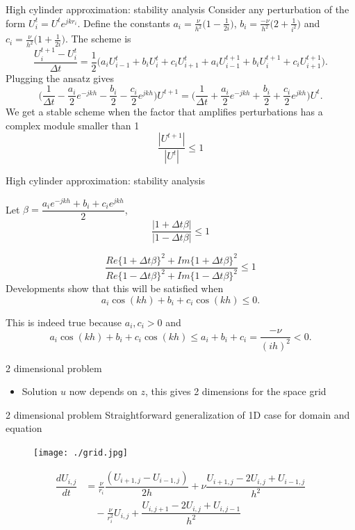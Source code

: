 \documentclass{beamer}
\begin{document}
\begin{frame}{High cylinder approximation: stability analysis}
Consider any perturbation of the form $U_{i}^{t}= U^{t}e^{jkr_i}.$
Define the constants $a_i=\frac{\nu}{h^2}\Big(1-\frac{1}{2i}\Big)$, $b_i=\frac{-\nu}{h^2}\Big(2+\frac{1}{i^2}\Big)$ and $c_i=\frac{\nu}{h^2}\Big(1+\frac{1}{2i}\Big)$. The scheme is 
$$\frac{U_{i}^{t+1}-U_{i}^{t}}{\Delta t}=\frac{1}{2}\Big( a_{i}U_{i-1}^{t}
+b_{i}U_{i}^{t}+c_{i}U_{i+1}^{t}
+ a_{i}U_{i-1}^{t+1}
+b_{i}U_{i}^{t+1}+c_{i}U_{i+1}^{t+1}\Big).$$
Plugging the ansatz gives
$$\Big(\frac{1}{\Delta t} -\frac{a_i}{2}e^{-jkh} -\frac{b_i}{2} -\frac{c_i}{2}e^{jkh}\Big)U^{t+1}=\Big(\frac{1}{\Delta t} +\frac{a_i}{2}e^{-jkh} +\frac{b_i}{2} +\frac{c_i}{2}e^{jkh}\Big)U^{t} .$$
 We get a stable scheme when the factor that amplifies perturbations has a complex module smaller than 1
 $$\dfrac{|U^{t+1}|}{|U^t|}\leq 1$$
\end{frame}
\begin{frame}{High cylinder approximation: stability analysis}

Let $\beta = \dfrac{a_ie^{-jkh} +b_i +c_ie^{jkh}}{2}$,
$$\dfrac{|1+\Delta t \beta|}{|1-\Delta t \beta|}\leq 1$$

$$\dfrac{Re\{1+\Delta t \beta\}^2 + Im\{1+\Delta t \beta\}^2 }{Re\{1-\Delta t \beta\}^2 + Im\{1-\Delta t \beta\}^2}\leq 1$$
Developments show that this will be satisfied when
$$a_i\cos(kh)+b_i + c_i \cos(kh)\leq 0.$$

This is indeed true because $a_i, c_i >0$ and
$$a_i\cos(kh)+b_i + c_i \cos(kh)\leq a_i + b_i + c_i = \frac{-\nu}{(ih)^2}< 0.$$

\end{frame}



\begin{frame}{2 dimensional problem}
\begin{itemize}
\item Solution $u$ now depends on $z$, this gives 2 dimensions for the space grid
\end{itemize}
\end{frame}

\begin{frame}{2 dimensional problem}
Straightforward generalization of 1D case for domain and equation

\begin{figure}[!h]
\centering
\texttt{[image: ./grid.jpg]}
\end{figure}
\begin{align*}
\dfrac{dU_{i,j}}{dt}&= \frac{\nu}{r_i}\dfrac{(U_{i+1,j}-U_{i-1,j})}{2h}+\nu\dfrac{U_{i+1,j}-2U_{i,j}+U_{i-1,j}}{h^2}\\ &\quad-\frac{\nu}{r_{i}^2}U_{i,j} 
+\dfrac{U_{i,j+1}-2U_{i,j}+U_{i,j-1}}{h^2} 
\end{align*}
\end{frame}
\end{document}
